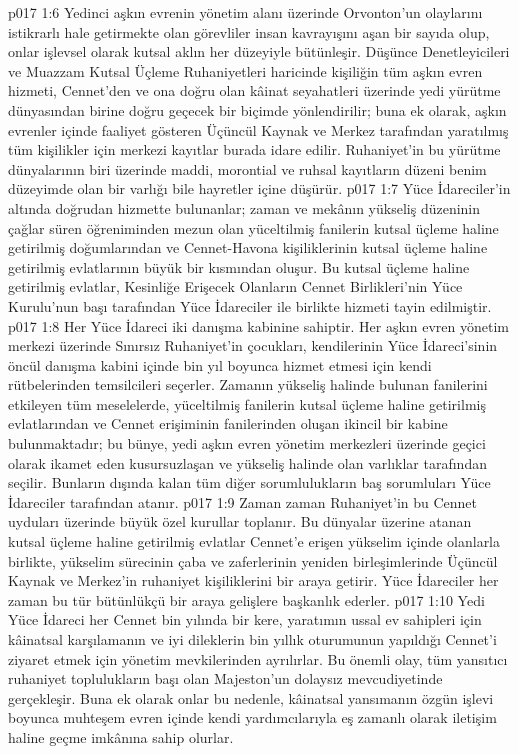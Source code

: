 \vs p017 1:6 Yedinci aşkın evrenin yönetim alanı üzerinde Orvonton’un olaylarını istikrarlı hale getirmekte olan görevliler insan kavrayışını aşan bir sayıda olup, onlar işlevsel olarak kutsal aklın her düzeyiyle bütünleşir. Düşünce Denetleyicileri ve Muazzam Kutsal Üçleme Ruhaniyetleri haricinde kişiliğin tüm aşkın evren hizmeti, Cennet’den ve ona doğru olan kâinat seyahatleri üzerinde yedi yürütme dünyasından birine doğru geçecek bir biçimde yönlendirilir; buna ek olarak, aşkın evrenler içinde faaliyet gösteren Üçüncül Kaynak ve Merkez tarafından yaratılmış tüm kişilikler için merkezi kayıtlar burada idare edilir. Ruhaniyet’in bu yürütme dünyalarının biri üzerinde maddi, morontial ve ruhsal kayıtların düzeni benim düzeyimde olan bir varlığı bile hayretler içine düşürür.
\vs p017 1:7 Yüce İdareciler’in altında doğrudan hizmette bulunanlar; zaman ve mekânın yükseliş düzeninin çağlar süren öğreniminden mezun olan yüceltilmiş fanilerin kutsal üçleme haline getirilmiş doğumlarından ve Cennet\hyp{}Havona kişiliklerinin kutsal üçleme haline getirilmiş evlatlarının büyük bir kısmından oluşur. Bu kutsal üçleme haline getirilmiş evlatlar, Kesinliğe Erişecek Olanların Cennet Birlikleri’nin Yüce Kurulu’nun başı tarafından Yüce İdareciler ile birlikte hizmeti tayin edilmiştir.
\vs p017 1:8 Her Yüce İdareci iki danışma kabinine sahiptir. Her aşkın evren yönetim merkezi üzerinde Sınırsız Ruhaniyet’in çocukları, kendilerinin Yüce İdareci’sinin öncül danışma kabini içinde bin yıl boyunca hizmet etmesi için kendi rütbelerinden temsilcileri seçerler. Zamanın yükseliş halinde bulunan fanilerini etkileyen tüm meselelerde, yüceltilmiş fanilerin kutsal üçleme haline getirilmiş evlatlarından ve Cennet erişiminin fanilerinden oluşan ikincil bir kabine bulunmaktadır; bu bünye, yedi aşkın evren yönetim merkezleri üzerinde geçici olarak ikamet eden kusursuzlaşan ve yükseliş halinde olan varlıklar tarafından seçilir. Bunların dışında kalan tüm diğer sorumlulukların baş sorumluları Yüce İdareciler tarafından atanır.
\vs p017 1:9 Zaman zaman Ruhaniyet’in bu Cennet uyduları üzerinde büyük özel kurullar toplanır. Bu dünyalar üzerine atanan kutsal üçleme haline getirilmiş evlatlar Cennet’e erişen yükselim içinde olanlarla birlikte, yükselim sürecinin çaba ve zaferlerinin yeniden birleşimlerinde Üçüncül Kaynak ve Merkez’in ruhaniyet kişiliklerini bir araya getirir. Yüce İdareciler her zaman bu tür bütünlükçü bir araya gelişlere başkanlık ederler.
\vs p017 1:10 Yedi Yüce İdareci her Cennet bin yılında bir kere, yaratımın ussal ev sahipleri için kâinatsal karşılamanın ve iyi dileklerin bin yıllık oturumunun yapıldığı Cennet’i ziyaret etmek için yönetim mevkilerinden ayrılırlar. Bu önemli olay, tüm yansıtıcı ruhaniyet toplulukların başı olan Majeston’un dolaysız mevcudiyetinde gerçekleşir. Buna ek olarak onlar bu nedenle, kâinatsal yansımanın özgün işlevi boyunca muhteşem evren içinde kendi yardımcılarıyla eş zamanlı olarak iletişim haline geçme imkânına sahip olurlar.

